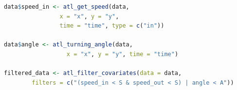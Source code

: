 \documentclass[10pt,paper=a4,headings=standardclasses
]{scrartcl}
\begin{document}
\begin{lstlisting}[float, language=R, style=customR, caption = {
    Filtering a movement track on incoming and outgoing speeds, and on turning angle to remove unrealistic movement.
    The functions \texttt{atl\_get\_speed} and \texttt{atl\_turning\_angle} are used to get the speeds and turning angles before filtering, and assigned to a column in the data (assignment of \texttt{speed\_out} is not shown).
    The filter step only retains positions with speeds below the speed threshold $S$ \textit{or} angles above the turning angle threshold $\theta$, i.e., positions where the animal is slow but makes sharp turns, and data where the animal moves quickly in a relatively straight line.}]
data$speed_in <- atl_get_speed(data,
                x = "x", y = "y",
                time = "time", type = c("in"))

data$angle <- atl_turning_angle(data,
                  x = "x", y = "y", time = "time")

filtered_data <- atl_filter_covariates(data = data,
        filters = c("(speed_in < S & speed_out < S) | angle < A"))
\end{lstlisting}

\end{document}
